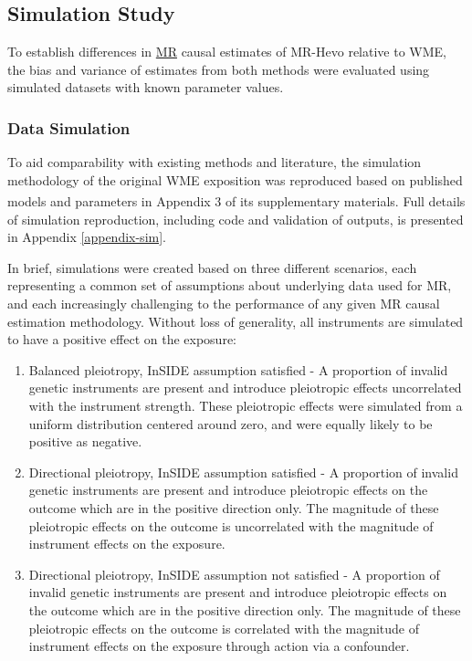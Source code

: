 \documentclass[
]{article}
\begin{document}
\subsection{Simulation Study}\label{simulation-study}

To establish differences in \hyperref[acronyms_MR]{MR} causal estimates of MR-Hevo relative to WME, the bias and variance of estimates from both methods were evaluated using simulated datasets with known parameter values.

\subsubsection{Data Simulation}\label{data-simulation}

To aid comparability with existing methods and literature, the simulation methodology of the original WME exposition was reproduced based on published models and parameters in Appendix 3 of its supplementary materials\textsuperscript{}. Full details of simulation reproduction, including code and validation of outputs, is presented in Appendix \ref{appendix-sim}.

In brief, simulations were created based on three different scenarios, each representing a common set of assumptions about underlying data used for MR, and each increasingly challenging to the performance of any given MR causal estimation methodology. Without loss of generality, all instruments are simulated to have a positive effect on the exposure:

\begin{enumerate}
\def\labelenumi{\arabic{enumi}.}
\item
  Balanced pleiotropy, InSIDE assumption satisfied - A proportion of invalid genetic instruments are present and introduce pleiotropic effects uncorrelated with the instrument strength. These pleiotropic effects were simulated from a uniform distribution centered around zero, and were equally likely to be positive as negative.
\item
  Directional pleiotropy, InSIDE assumption satisfied - A proportion of invalid genetic instruments are present and introduce pleiotropic effects on the outcome which are in the positive direction only. The magnitude of these pleiotropic effects on the outcome is uncorrelated with the magnitude of instrument effects on the exposure.
\item
  Directional pleiotropy, InSIDE assumption not satisfied - A proportion of invalid genetic instruments are present and introduce pleiotropic effects on the outcome which are in the positive direction only. The magnitude of these pleiotropic effects on the outcome is correlated with the magnitude of instrument effects on the exposure through action via a confounder.
\end{enumerate}
\end{document}
